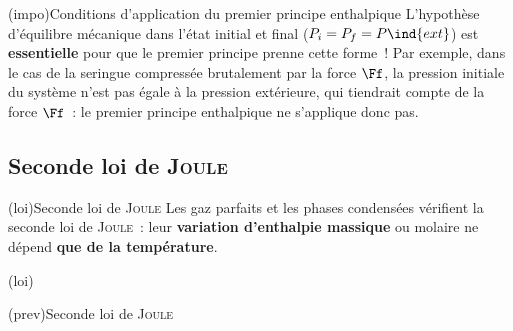 \documentclass[../../main/main.tex]{subfiles}
\begin{document}
\begin{tcb*}[%
		list entry={\hspace*{-20pt}\protect\rcheck~~Conditions 1\ier{} ppe.\ enthalpique}%
	](impo){Conditions d'application du premier principe enthalpique}
	L’hypothèse d’équilibre mécanique dans l’état initial et final ($P_i = P_f =
		P\ind{ext}$) est \textbf{essentielle} pour que le premier principe prenne
	cette forme~! Par exemple, dans le cas de la seringue compressée brutalement
	par la force $\Ff$, la pression initiale du système n’est pas égale à la
	pression extérieure, qui tiendrait compte de la force $\Ff$~: le premier
  principe enthalpique ne s'applique donc pas.
\end{tcb*}

\subsection{Seconde loi de \textsc{Joule}}

\begin{tcb*}(loi){Seconde loi de \textsc{Joule}}
	Les gaz parfaits et les phases condensées vérifient la seconde loi de
	\textsc{Joule}~: leur \textbf{variation d'enthalpie massique} ou molaire
	ne dépend \textbf{que de la température}.
	\smallbreak
	\begin{isd}[sidebyside align=top, interior hidden](loi)
		\psw{%
			\[
				\boxed{h = h(T)}
			\]
		}%
		\vspace{-15pt}
		\tcblower
		\psw{%
			\[
				\boxed{H_m = \frac{D+2}{2}RT}
			\]
		}%
		\vspace{-15pt}
	\end{isd}
\end{tcb*}

\begin{tcb*}[sidebyside](prev){Seconde loi de \textsc{Joule}}
	\vspace{-15pt}
	\tcblower
	\vspace{-15pt}
\end{tcb*}
\end{document}
